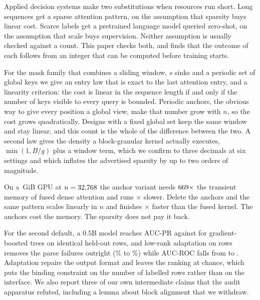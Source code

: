 Applied decision systems make two substitutions when resources run short. Long
sequences get a sparse attention pattern, on the assumption that sparsity buys
linear cost. Scarce labels get a pretrained language model queried zero-shot, on
the assumption that scale buys supervision. Neither assumption is usually checked
against a count. This paper checks both, and finds that the outcome of each
follows from an integer that can be computed before training starts.

For the mask family that combines a sliding window, $s$ sinks and a periodic set
of global keys we give an entry law that is exact to the last attention entry, and
a linearity criterion: the cost is linear in the sequence length if and only if
the number of keys visible to every query is bounded. Periodic anchors, the
obvious way to give every position a global view, make that number grow with $n$,
so the cost grows quadratically. Designs with a fixed global set keep the same
window and stay linear, and this count is the whole of the difference between the
two. A second law gives the density a block-granular kernel actually executes,
$\min(1,B/g)$ plus a window term, which we confirm to three decimals at six
settings and which inflates the advertised sparsity by up to two orders of
magnitude.

On a \GpuMemGiB\,GiB GPU at $n=32{,}768$ the anchor variant needs
$669\times$ the transient memory of fused dense attention and runs
\LatencySlowdownVsSdpa$\times$ slower. Delete the anchors and the same pattern
scales linearly in $n$ and finishes \LatSlidingRatio$\times$ faster than the fused
kernel. The anchors cost the memory. The sparsity does not pay it back.

For the second default, a $0.5$B model reaches AUC-PR \LlmAucPr{} against
\GbdtSameAucPr{} for gradient-boosted trees on identical held-out rows, and
low-rank adaptation on \SftRows{} rows removes the parse failures outright
(\ParseFailZero\% to \SftParseFail\%) while AUC-ROC falls from \LlmAucRoc{} to
\SftAucRoc. Adaptation repairs the output format and leaves the ranking at chance,
which puts the binding constraint on the number of labelled rows rather than on
the interface. We also report three of our own intermediate claims that the audit
apparatus refuted, including a lemma about block alignment that we withdraw.
